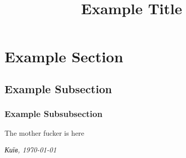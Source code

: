 \documentclass[
a5paper,
14pt,
onehalfspacing,
headsepline,
notitlepage,
normalheadings,
twoside,
DIVcalc]{book}
\date{}
\author{}
\title{Example Title}
\begin{document}
\maketitle




\section{Example Section}

\subsection{Example Subsection}

\subsubsection{Example Subsubsection}

The mother fucker is here

\blindtext

\newpage

\begin{flushright}
\textit{Київ, \today}
\end{flushright}
\end{document}
